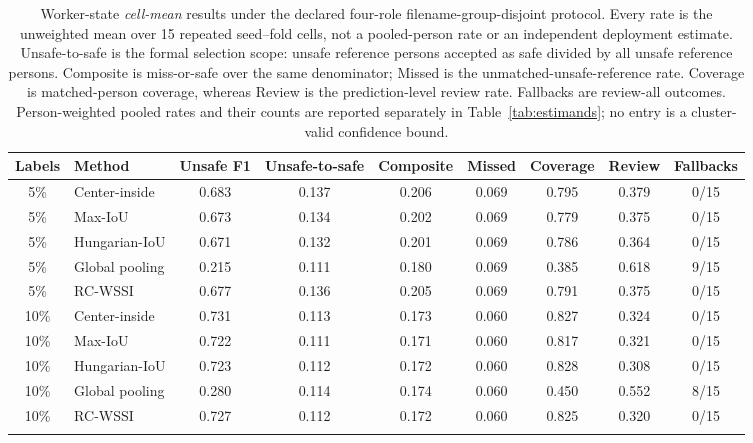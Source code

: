 \documentclass[iicol,pdflatex,sn-mathphys-num]{sn-jnl}
\begin{document}
\begin{table}[t]
\caption{Worker-state \emph{cell-mean} results under the declared four-role filename-group-disjoint protocol. Every rate is the unweighted mean over 15 repeated seed--fold cells, not a pooled-person rate or an independent deployment estimate. Unsafe-to-safe is the formal selection scope: unsafe reference persons accepted as safe divided by all unsafe reference persons. Composite is miss-or-safe over the same denominator; Missed is the unmatched-unsafe-reference rate. Coverage is matched-person coverage, whereas Review is the prediction-level review rate. Fallbacks are review-all outcomes. Person-weighted pooled rates and their counts are reported separately in Table~\ref{tab:estimands}; no entry is a cluster-valid confidence bound.}
\label{tab:main}
\centering
\scriptsize
\setlength{\tabcolsep}{2.5pt}
\begin{tabular}{@{}c l c c c c c c c@{}}
\toprule
Labels & Method & Unsafe F1 & Unsafe-to-safe & Composite & Missed & Coverage & Review & Fallbacks \\
\midrule
5\% & Center-inside & 0.683 & 0.137 & 0.206 & 0.069 & 0.795 & 0.379 & 0/15 \\
5\% & Max-IoU & 0.673 & 0.134 & 0.202 & 0.069 & 0.779 & 0.375 & 0/15 \\
5\% & Hungarian-IoU & 0.671 & 0.132 & 0.201 & 0.069 & 0.786 & 0.364 & 0/15 \\
5\% & Global pooling & 0.215 & 0.111 & 0.180 & 0.069 & 0.385 & 0.618 & 9/15 \\
5\% & RC-WSSI & 0.677 & 0.136 & 0.205 & 0.069 & 0.791 & 0.375 & 0/15 \\
\midrule
10\% & Center-inside & 0.731 & 0.113 & 0.173 & 0.060 & 0.827 & 0.324 & 0/15 \\
10\% & Max-IoU & 0.722 & 0.111 & 0.171 & 0.060 & 0.817 & 0.321 & 0/15 \\
10\% & Hungarian-IoU & 0.723 & 0.112 & 0.172 & 0.060 & 0.828 & 0.308 & 0/15 \\
10\% & Global pooling & 0.280 & 0.114 & 0.174 & 0.060 & 0.450 & 0.552 & 8/15 \\
10\% & RC-WSSI & 0.727 & 0.112 & 0.172 & 0.060 & 0.825 & 0.320 & 0/15 \\
\botrule
\end{tabular}
\end{table}
\end{document}
